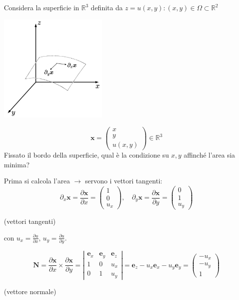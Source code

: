 \documentclass[a4paper,11pt]{report}
\newcommand{\vect}[1]{\boldsymbol{#1}}
\newcommand{\R}{\mathbb{R}}
\newcommand{\x}{\boldsymbol{x}}
\begin{document}
Considera la superficie in $\R^3$ definita da $z=u(x,y) : (x,y) \in \Omega \subset \R^2$
\begin{center}
\includegraphics[width=0.4\textwidth]{immagini/superficie}
\end{center}
\[
\x = \left( \begin{matrix}
x\\
y\\
u(x,y)
\end{matrix}\right) \in \R^3
\]
Fissato il bordo della superficie, qual \`e la condizione su $x,y$ affinch\'e l'area sia minima?

Prima si calcola l'area $\rightarrow$ servono i vettori tangenti:
\[
\partial_x \x = \frac{\partial \x}{\partial x} =\left( \begin{matrix}
1\\
0\\
u_x
\end{matrix}\right) ,\quad 
\partial_y \x = \frac{\partial \x}{\partial y} =\left( \begin{matrix}
0\\
1\\
u_y
\end{matrix}\right)
\]
\centerline{(vettori tangenti)}
con $u_x=\frac{\partial u}{\partial x}$, $u_y=\frac{\partial u}{\partial y}$.

\[
\vect{N}=\frac{\partial \x}{\partial x} \times \frac{\partial \x}{\partial y}=\left| \begin{matrix}
\vect{e}_x & \vect{e}_y & \vect{e}_z \\
1 & 0 & u_x \\
0 & 1 & u_y
\end{matrix}\right| = \vect{e}_z-u_x \vect{e}_x - u_y \vect{e}_y = \left( \begin{matrix}
-u_x \\
-u_y \\
1
\end{matrix}\right)
\]
\centerline{(vettore normale)}
\end{document}
